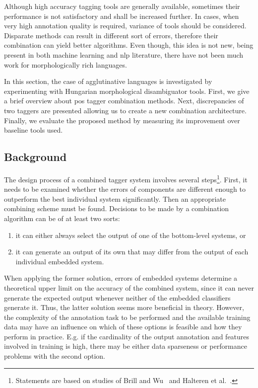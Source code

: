 Although high accuracy tagging tools are generally available, sometimes their performance is not satisfactory and shall be increased further.
In cases, when very high annotation quality is required, variance of tools should be considered.
Disparate methods can result in different sort of errors, therefore their combination can yield better algorithms.
Even though, this idea is not new, being present in both machine learning and \acrshort{nlp} literature, there have not been much work for morphologically rich languages. 

In this section, the case of agglutinative languages is investigated by experimenting with Hungarian morphological disambiguator tools.
First, we give a brief overview about \acrshort{pos} tagger combination methods.
Next, discrepancies of two taggers are presented allowing us to create a new combination architecture.
Finally, we evaluate the proposed method by measuring its improvement over baseline tools used.

\subsection{Background}

The design process of a combined tagger system involves several steps\footnote{Statements are based on studies of Brill and Wu~\cite{Brill1998} and Halteren et al.~\cite{Halteren2001}.}.
First, it needs to be examined whether the errors of components are different enough to outperform the best individual system significantly.
Then an appropriate combining scheme must be found.
Decisions to be made by a combination algorithm can be of at least two sorts: 
\begin{enumerate}
  \item it can either always select the output of one of the bottom-level systems, or 
  \item it can generate an output of its own that may differ from the output of each individual embedded system. 
\end{enumerate}

When applying the former solution, errors of embedded systems determine a theoretical upper limit on the accuracy of the combined system, since it can never generate the expected output whenever neither of the embedded classifiers generate it.
Thus, the latter solution seems more beneficial in theory.
However, the complexity of the annotation task to be performed and the available training data may have an influence on which of these options is feasible and how they perform in practice.
E.g. if the cardinality of the output annotation and features involved in training is high, there may be either data sparseness or performance problems with the second option.

